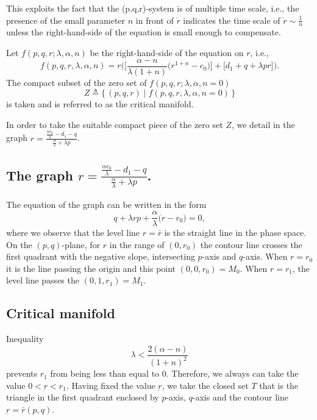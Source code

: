\documentclass[a4paper,11pt]{article}
\begin{document}
This exploits the fact that the (p,q,r)-system is of multiple time scale, i.e., the presence of the small parameter $n$ in front of  $\dot{r}$ indicates the time scale of $\dot{r}\sim \frac{1}{n}$ unless the right-hand-side of the equation is small enough to compensate.

Let $f(p,q,r;\lambda,\alpha,n)$ be the right-hand-side of the equation on $r$, i.e.,
\begin{equation}
 f(p,q,r,\lambda,\alpha,n) = r\Big( \Big[\frac{\alpha-n}{\lambda(1+n)}\Big(r^{1+n}-c_0\Big)\Big]+\Big[d_1 + q + \lambda pr\Big]\Big).
\end{equation}
The compact subset of the zero set of $f(p,q,r;\lambda,\alpha,n=0)$
$$ Z \triangleq \{\,(p,q,r)\; | \; f(p,q,r,\lambda,\alpha,n=0)\, \} $$
is taken and is referred to as the critical manifold.

In order to take the suitable compact piece of the zero set $Z$, we detail in the graph $\displaystyle r=\frac{ \frac{\alpha c_0}{\lambda} - d_1 -q }{ \frac{\alpha}{\lambda} + \lambda p}$.

\subsection*{The graph $\displaystyle r=\frac{ \frac{\alpha c_0}{\lambda} - d_1 -q }{ \frac{\alpha}{\lambda} + \lambda p}$.}
The equation of the graph can be written in the form
\begin{equation}
 q + \lambda {r}p + \frac{\alpha}{\lambda} \Big( r-r_0\Big)=0, \label{eq:level}
\end{equation}
where we observe that the level line $r=\bar{r}$ is the straight line in the phase space. On the $(p,q)$-plane, for $r$ in the range of $(0,r_0)$ the contour line crosses the first quadrant with the negative slope, intersecting $p$-axis and $q$-axis. When $r=r_0$ it is the line passing the origin and this point $(0,0,r_0) = M_0$. When $r=r_1$, the level line passes the $(0,1,r_1)=M_1$.

\subsection*{Critical manifold}
Inequality
$$ \lambda < \frac{2(\alpha-n)}{(1+n)^2} $$
prevents $r_1$ from being less than equal to $0$. Therefore, we always can take the value $0<\underbar{r}<r_1$. Having fixed the value $\underbar{r}$, we take the closed set $T$ that is the triangle in the first quadrant enclosed by $p$-axis, $q$-axis and the contour line $\underbar{r} = \bar{r}(p,q)$.
\end{document}
